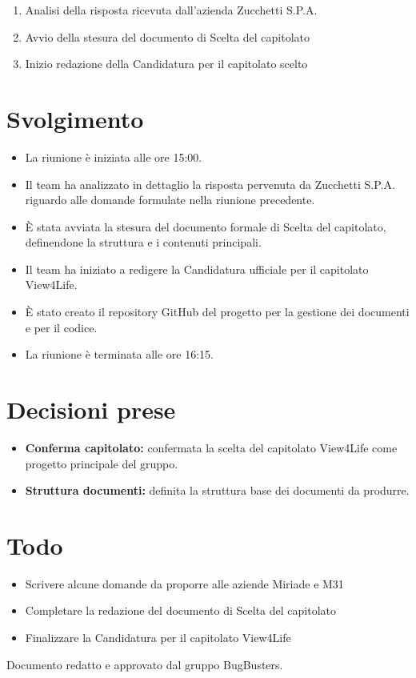 \documentclass[a4paper,12pt]{article}
\begin{document}
\begin{enumerate}
    \item Analisi della risposta ricevuta dall'azienda Zucchetti S.P.A.
    \item Avvio della stesura del documento di Scelta del capitolato
    \item Inizio redazione della Candidatura per il capitolato scelto
\end{enumerate}

\section{Svolgimento}

\begin{itemize}
    \item La riunione è iniziata alle ore 15:00.
    \item Il team ha analizzato in dettaglio la risposta pervenuta da Zucchetti S.P.A. riguardo alle domande formulate nella riunione precedente.
    \item È stata avviata la stesura del documento formale di Scelta del capitolato, definendone la struttura e i contenuti principali.
    \item Il team ha iniziato a redigere la Candidatura ufficiale per il capitolato View4Life.
    \item È stato creato il repository GitHub del progetto per la gestione dei documenti e per il codice.
    \item La riunione è terminata alle ore 16:15.
\end{itemize}

\section{Decisioni prese}

\begin{itemize}
    \item \textbf{Conferma capitolato:} confermata la scelta del capitolato View4Life come progetto principale del gruppo.
    \item \textbf{Struttura documenti:} definita la struttura base dei documenti da produrre.
\end{itemize}

\section{Todo}

\begin{tcolorbox}[colback=secondaryblue!8,colframe=secondaryblue!60,arc=2mm,boxrule=0.5pt,left=10pt,right=10pt]
\begin{itemize}[topsep=5pt]
    \item Scrivere alcune domande da proporre alle aziende Miriade e M31
    \item Completare la redazione del documento di Scelta del capitolato
    \item Finalizzare la Candidatura per il capitolato View4Life
\end{itemize}
\end{tcolorbox}

\vfill
\begin{center}
    {\small\color{darkgray} Documento redatto e approvato dal gruppo BugBusters.}
\end{center}
\end{document}
